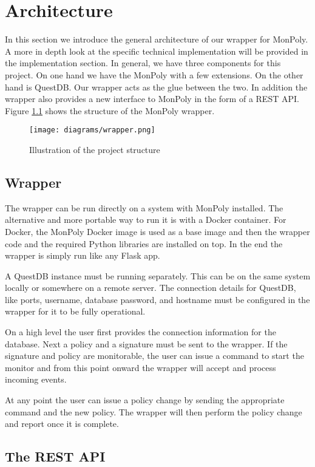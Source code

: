 \chapter{Architecture}

In this section we introduce the general architecture of our wrapper for MonPoly.
A more in depth look at the specific technical implementation will be provided in the implementation section.
In general, we have three components for this project.
On one hand we have the MonPoly with a few extensions.
On the other hand is QuestDB.
Our wrapper acts as the glue between the two.
In addition the wrapper also provides a new interface to MonPoly in the form of a REST API.
Figure \ref{fig:wrapper} shows the structure of the MonPoly wrapper.

\begin{figure}
  \centering
  \texttt{[image: diagrams/wrapper.png]}
  \caption{Illustration of the project structure}
  \label{fig:wrapper}
\end{figure}


\section{Wrapper}

The wrapper can be run directly on a system with MonPoly installed.
The alternative and more portable way to run it is with a Docker container.
For Docker, the MonPoly Docker image is used as a base image and then the wrapper code and the required Python libraries are installed on top.
In the end the wrapper is simply run like any Flask app.

A QuestDB instance must be running separately.
This can be on the same system locally or somewhere on a remote server.
The connection details for QuestDB, like ports, username, database password, and hostname must be configured in the wrapper for it to be fully operational.

On a high level the user first provides the connection information for the database.
Next a policy and a signature must be sent to the wrapper.
If the signature and policy are monitorable, the user can issue a command to start the monitor and from this point onward the wrapper will accept and process incoming events.

At any point the user can issue a policy change by sending the appropriate command and the new policy.
The wrapper will then perform the policy change and report once it is complete.

\section{The REST API}

